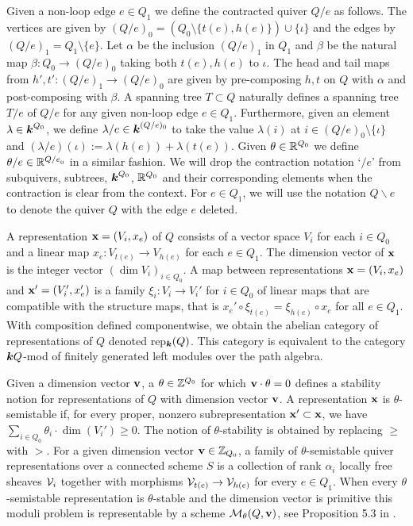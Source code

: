 \documentclass{amsart}
\theoremstyle{definition}
\begin{document}
Given a non-loop edge $e \in Q_1$ we define the contracted quiver $Q/e$ as follows. The vertices are given by $(Q/e)_0 = (Q_0 \setminus \{t(e),h(e)\}) \cup \{\iota\}$ and the edges by $(Q/e)_1 = Q_1 \setminus \{e\}$. 
Let $\alpha$ be the inclusion $(Q/e)_1$ in $Q_1$ and $\beta$ be the natural map $\beta \colon Q_0 \rightarrow (Q/e)_0$ taking both $t(e),h(e)$ to $\iota$. 
The head and tail maps from $h',t' \colon (Q/e)_1 \rightarrow (Q/e)_0$ are given by pre-composing $h,t$ on $Q$ with $\alpha$ and post-composing with $\beta$.
A spanning tree $T \subset Q$ naturally defines a spanning tree $T/e$ of $Q/e$ for any given non-loop edge $e\in Q_1$.
Furthermore, given an element $\lambda \in {\boldsymbol{k}}^{Q_0}$, we define $\lambda/e \in {\boldsymbol{k}}^{(Q/e)_0}$ to take the value $\lambda(i)$ at $i \in (Q/e)_0 \setminus \{\iota\}$ and $(\lambda/e)(\iota):=\lambda(h(e))+\lambda(t(e))$.
Given $\theta \in \mathbb{R}^{Q_0}$ we define $\theta/e \in \mathbb{R}^{{Q/e}_0}$ in a similar fashion.
We will drop the contraction notation `$/e$' from subquivers, subtrees, ${\boldsymbol{k}}^{Q_0}$, $\mathbb{R}^{Q_0}$ and their corresponding elements when the contraction is clear from the context.
For $e \in Q_1$, we will use the notation $Q \backslash e$ to denote the quiver $Q$ with the edge $e$ deleted.

A representation $\mathbf{x} = (V_i, x_e)$ of $Q$ consists of a vector space $V_i$ for each $i \in Q_0$ and a linear map $x_e \colon V_{t(e)} \rightarrow V_{h(e)}$ for each $e \in Q_1$. 
The dimension vector of $\mathbf{x}$ is the integer vector $(\dim V_{i})_{i\in Q_0}$.  
A map between representations $\mathbf{x} = (V_i, x_e)$ and $\mathbf{x}' = (V_i', x_e')$ is a family $\xi_{i} \colon V_i^{\,} \rightarrow V_i'$ for $i \in Q_0$ of linear maps that are compatible with the structure maps, that is $x_e' \circ\xi_{t(e)} = \xi_{h(e)} \circ x_e$ for all $e \in Q_1$.  
With composition defined componentwise, we obtain the abelian category of representations of $Q$ denoted rep$_{\boldsymbol{k}}(Q)$. 
This category is equivalent to the category ${\boldsymbol{k}} Q$-mod of finitely generated left modules over the path algebra.

Given a dimension vector $\mathbf{v}$, a $\theta \in \mathbb{Z}^{Q_0}$ for which $\mathbf{v} \cdot \theta=0$ defines a stability notion for representations of $Q$ with dimension vector $\mathbf{v}$.
A representation $\mathbf{x}$ is $\theta$-semistable if, for every proper, nonzero subrepresentation $\mathbf{x}' \subset \mathbf{x}$, we have $\sum_{i \in Q_0} \theta_i \cdot \dim(V_i') \geq 0$.  
The notion of $\theta$-stability is obtained by replacing $\geq$ with $>$. 
For a given dimension vector $\mathbf{v} \in \mathbb{Z}_{Q_0}$, a family of $\theta$-semistable quiver representations over a connected scheme $S$ is a collection of rank $\alpha_i$ locally free sheaves $\mathcal{V}_i$ together with morphisms $\mathcal{V}_{t(e)} \rightarrow \mathcal{V}_{h(e)}$ for every $e\in Q_1$. 
When every $\theta$-semistable representation is $\theta$-stable and the dimension vector is primitive this moduli problem is representable by a scheme $\mathcal{M}_\theta(Q, \mathbf{v})$, see Proposition 5.3 in \cite{King}.
\end{document}
